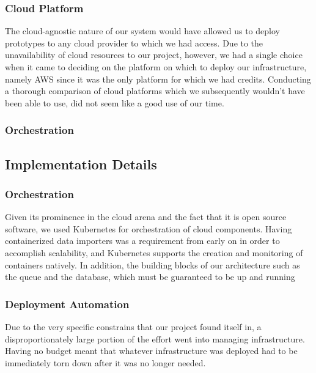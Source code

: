 \subsubsection{Cloud Platform}\label{cloud-platform}

The cloud-agnostic nature of our system would have allowed us to deploy
prototypes to any cloud provider to which we had access. Due to the
unavailability of cloud resources to our project, however, we had a
single choice when it came to deciding on the platform on which to
deploy our infrastructure, namely AWS since it was the only platform for
which we had credits. Conducting a thorough comparison of cloud
platforms which we subsequently wouldn't have been able to use, did not
seem like a good use of our time.

\subsubsection{Orchestration}\label{orchestration}

\subsection{Implementation Details}\label{implementation-details}

\subsubsection{Orchestration}\label{orchestration-1}

Given its prominence in the cloud arena and the fact that it is open
source software, we used Kubernetes for orchestration of cloud
components. Having containerized data importers was a requirement from
early on in order to accomplish scalability, and Kubernetes supports the
creation and monitoring of containers natively. In addition, the
building blocks of our architecture such as the queue and the database,
which must be guaranteed to be up and running

\subsubsection{Deployment Automation}\label{deployment-automation}

Due to the very specific constrains that our project found itself in, a
disproportionately large portion of the effort went into managing
infrastructure. Having no budget meant that whatever infrastructure was
deployed had to be immediately torn down after it was no longer needed.

